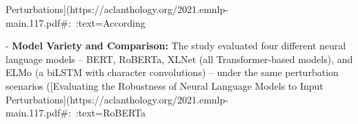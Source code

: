 Perturbations](https://aclanthology.org/2021.emnlp-main.117.pdf#:~:text=According%

- \textbf{Model Variety and Comparison:} The study evaluated four different neural language models – BERT, RoBERTa, XLNet (all Transformer-based models), and ELMo (a biLSTM with character convolutions) – under the same perturbation scenarios ([Evaluating the Robustness of Neural Language Models to Input Perturbations](https://aclanthology.org/2021.emnlp-main.117.pdf#:~:text=RoBERTa%

